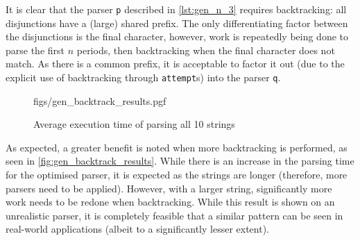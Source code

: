 It is clear that the parser \texttt{p} described in \autoref{lst:gen_n_3} requires backtracking: all disjunctions have a (large) shared prefix.
The only differentiating factor between the disjunctions is the final character, however, work is repeatedly being done to parse the first $n$ periods, then backtracking when the final character does not match.
As there is a common prefix, it is acceptable to factor it out (due to the explicit use of backtracking through \texttt{attempt}s) into the parser \texttt{q}.

\begin{figure}[H]
    \centering
    {figs/gen_backtrack_results.pgf}
    \vspace{-0.5\baselineskip}
    \caption{Average execution time of parsing all 10 strings}
    \label{fig:gen_backtrack_results}
\end{figure}

As expected, a greater benefit is noted when more backtracking is performed, as seen in \autoref{fig:gen_backtrack_results}.
While there is an increase in the parsing time for the optimised parser, it is expected as the strings are longer (therefore, more parsers need to be applied).
However, with a larger string, significantly more work needs to be redone when backtracking.
While this result is shown on an unrealistic parser, it is completely feasible that a similar pattern can be seen in real-world applications (albeit to a significantly lesser extent).
